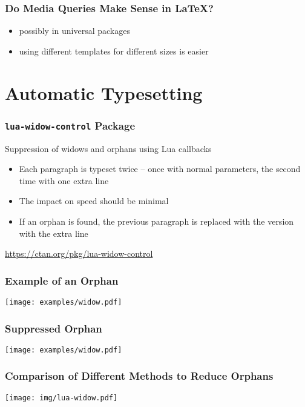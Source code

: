 \begin{frame}
  \frametitle{Do Media Queries Make Sense in \LaTeX?}
  \begin{itemize}
    \item possibly in universal packages
    \item using different templates for different sizes is easier
  \end{itemize}
\end{frame}

\section{Automatic Typesetting}

\begin{frame}
  \frametitle{\texttt{lua-widow-control} Package}
  Suppression of widows and orphans using Lua callbacks
  \begin{itemize}
    \item Each paragraph is typeset twice -- once with normal parameters, the second time with one extra line
    \item The impact on speed should be minimal
    \item If an orphan is found, the previous paragraph is replaced with the version with the extra line
  \end{itemize}
  \url{https://ctan.org/pkg/lua-widow-control}
\end{frame}

\begin{frame}
  \frametitle{Example of an Orphan}
  \begin{center}
    \texttt{[image: examples/widow.pdf]}
  \end{center}
\end{frame}

\begin{frame}
  \frametitle{Suppressed Orphan}
  \begin{center}
    \texttt{[image: examples/widow.pdf]}
  \end{center}
\end{frame}

\begin{frame}
  \frametitle{Comparison of Different Methods to Reduce Orphans}
  \begin{priklad}
  \begin{center}
  \texttt{[image: img/lua-widow.pdf]}
  \end{center}
  \end{priklad}
\end{frame}


